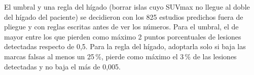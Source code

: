 El umbral y una regla del hígado (borrar islas cuyo SUVmax no llegue al doble del hígado del paciente) se decidieron con los 825 estudios predichos fuera de pliegue y con reglas escritas antes de ver los números. Para el umbral, el de mayor \dmas{} entre los que pierden como máximo 2 puntos porcentuales de lesiones detectadas respecto de 0,5. Para la regla del hígado, adoptarla solo si baja las marcas falsas al menos un 25\,\%, pierde como máximo el 3\,\% de las lesiones detectadas y no baja el \dmas{} más de 0,005.
